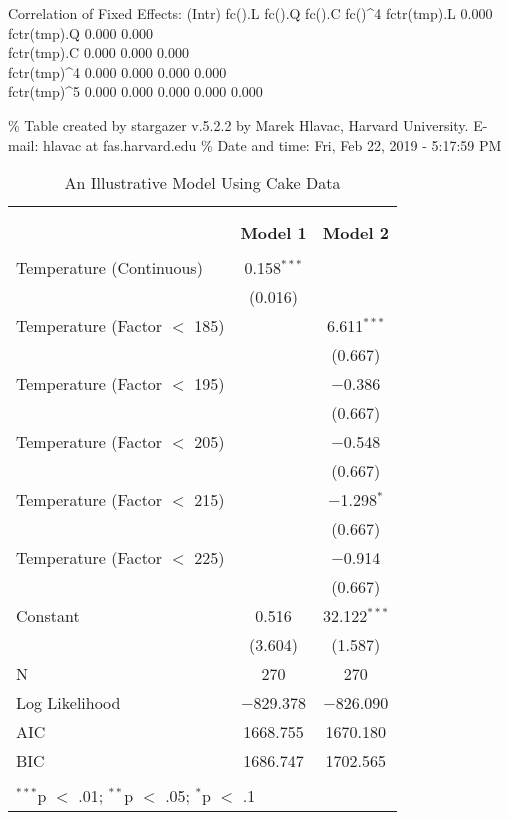 \documentclass[]{article}
\begin{document}
Correlation of Fixed Effects: (Intr) fc().L fc().Q fc().C fc()\^{}4
fctr(tmp).L 0.000\\
fctr(tmp).Q 0.000 0.000\\
fctr(tmp).C 0.000 0.000 0.000\\
fctr(tmp)\^{}4 0.000 0.000 0.000 0.000\\
fctr(tmp)\^{}5 0.000 0.000 0.000 0.000 0.000

\% Table created by stargazer v.5.2.2 by Marek Hlavac, Harvard
University. E-mail: hlavac at fas.harvard.edu \% Date and time: Fri, Feb
22, 2019 - 5:17:59 PM

\begin{table}[!htbp] \centering 
  \caption{An Illustrative Model Using Cake Data} 
  \label{} 
\begin{tabular}{@{\extracolsep{5pt}}lcc} 
\\[-1.8ex]\hline \\[-1.8ex] 
\\[-1.8ex] & \textbf{Model 1} & \textbf{Model 2}\\ 
\hline \\[-1.8ex] 
 Temperature (Continuous) & 0.158$^{***}$ &  \\ 
  & (0.016) &  \\ 
  Temperature (Factor $<$ 185) &  & 6.611$^{***}$ \\ 
  &  & (0.667) \\ 
  Temperature (Factor $<$ 195) &  & $-$0.386 \\ 
  &  & (0.667) \\ 
  Temperature (Factor $<$ 205) &  & $-$0.548 \\ 
  &  & (0.667) \\ 
  Temperature (Factor $<$ 215) &  & $-$1.298$^{*}$ \\ 
  &  & (0.667) \\ 
  Temperature (Factor $<$ 225) &  & $-$0.914 \\ 
  &  & (0.667) \\ 
  Constant & 0.516 & 32.122$^{***}$ \\ 
  & (3.604) & (1.587) \\ 
 N & 270 & 270 \\ 
Log Likelihood & $-$829.378 & $-$826.090 \\ 
AIC & 1668.755 & 1670.180 \\ 
BIC & 1686.747 & 1702.565 \\ 
\hline \\[-1.8ex] 
\multicolumn{3}{l}{$^{***}$p $<$ .01; $^{**}$p $<$ .05; $^{*}$p $<$ .1} \\ 
\end{tabular} 
\end{table}
\end{document}
